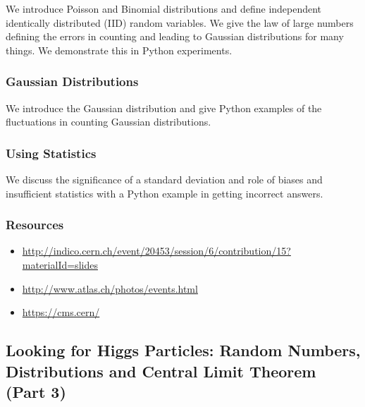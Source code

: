 We introduce Poisson and Binomial distributions and define independent
identically distributed (IID) random variables. We give the law of large
numbers defining the errors in counting and leading to Gaussian
distributions for many things. We demonstrate this in Python
experiments.


\subsubsection{Gaussian Distributions}\label{gaussian-distributions}

We introduce the Gaussian distribution and give Python examples of the
fluctuations in counting Gaussian distributions.


\subsubsection{Using Statistics}\label{using-statistics}

We discuss the significance of a standard deviation and role of biases
and insufficient statistics with a Python example in getting incorrect
answers.


\subsubsection{Resources}\label{resources-2}

\begin{itemize}

\item
  \url{http://indico.cern.ch/event/20453/session/6/contribution/15?materialId=slides}
\item
  \url{http://www.atlas.ch/photos/events.html}
\item
  \url{https://cms.cern/}
\end{itemize}

\subsection{Looking for Higgs Particles: Random Numbers, Distributions
and Central Limit Theorem (Part
3)}\label{looking-for-higgs-particles-random-numbers-distributions-and-central-limit-theorem-part-3}


